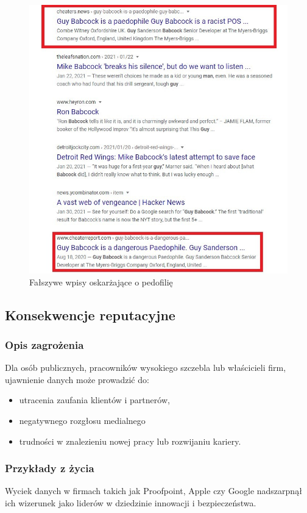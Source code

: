 \begin{figure}
  \centering
  \includegraphics[width=1\textwidth]{images/pedophile.jpg}
  \caption{Fałszywe wpisy oskarżające o pedofilię}
  \label{fig:pedophile}
\end{figure} 

\subsection{Konsekwencje reputacyjne}
\subsubsection{Opis zagrożenia}
Dla osób publicznych, pracowników wysokiego szczebla lub właścicieli firm, ujawnienie danych może prowadzić do:
\begin{itemize}
\item utracenia zaufania klientów i partnerów,
\item negatywnego rozgłosu medialnego
\item trudności w znalezieniu nowej pracy lub rozwijaniu kariery.
\end{itemize}
\subsubsection{Przykłady z życia}
Wyciek danych w firmach takich jak Proofpoint, Apple czy Google nadszarpnął ich wizerunek jako liderów w dziedzinie innowacji i bezpieczeństwa.\\

